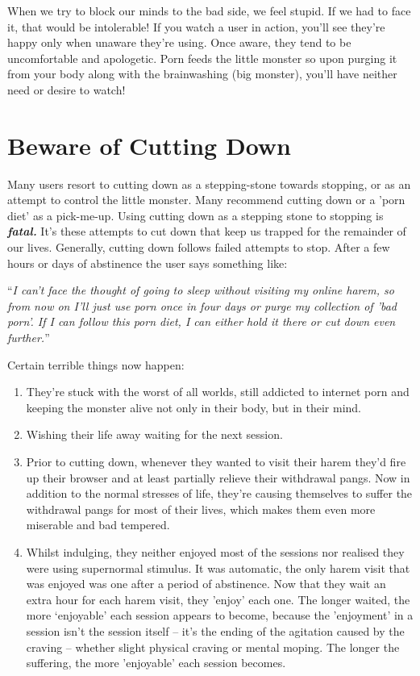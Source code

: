 \documentclass[
]{book}
\begin{document}
When we try to block our minds to the bad side, we feel stupid. If we had to face it, that would be intolerable! If you watch a user in action, you'll see they're happy only when unaware they're using. Once aware, they tend to be uncomfortable and apologetic. Porn feeds the little monster so upon purging it from your body along with the brainwashing (big monster), you'll have neither need or desire to watch!

\hypertarget{beware-of-cutting-down}{%
\chapter{Beware of Cutting Down}\label{beware-of-cutting-down}}

Many users resort to cutting down as a stepping-stone towards stopping, or as an attempt to control the little monster. Many recommend cutting down or a 'porn diet' as a pick-me-up. Using cutting down as a stepping stone to stopping is \textbf{\emph{fatal.}} It's these attempts to cut down that keep us trapped for the remainder of our lives. Generally, cutting down follows failed attempts to stop. After a few hours or days of abstinence the user says something like:

``\emph{I can't face the thought of going to sleep without visiting my online harem, so from now on I'll just use porn once in four days or purge my collection of 'bad porn'. If I can follow this porn diet, I can either hold it there or cut down even further.}''

Certain terrible things now happen:

\begin{enumerate}
\def\labelenumi{\arabic{enumi}.}
\item
  They're stuck with the worst of all worlds, still addicted to internet porn and keeping the monster alive not only in their body, but in their mind.
\item
  Wishing their life away waiting for the next session.
\item
  Prior to cutting down, whenever they wanted to visit their harem they'd fire up their browser and at least partially relieve their withdrawal pangs. Now in addition to the normal stresses of life, they're causing themselves to suffer the withdrawal pangs for most of their lives, which makes them even more miserable and bad tempered.
\item
  Whilst indulging, they neither enjoyed most of the sessions nor realised they were using supernormal stimulus. It was automatic, the only harem visit that was enjoyed was one after a period of abstinence.
  Now that they wait an extra hour for each harem visit, they 'enjoy' each one. The longer waited, the more `enjoyable' each session appears to become, because the 'enjoyment' in a session isn't the session itself -- it's the ending of the agitation caused by the craving -- whether slight physical craving or mental moping. The longer the suffering, the more 'enjoyable' each session becomes.
\end{enumerate}
\end{document}
